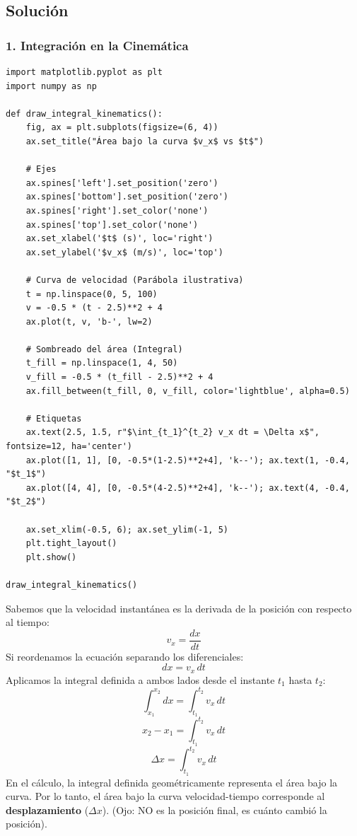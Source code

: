 \documentclass[12pt, a4paper]{article}
\begin{document}
\subsection*{Solución}

\subsubsection*{1. Integración en la Cinemática}

\begin{lstlisting}
import matplotlib.pyplot as plt
import numpy as np

def draw_integral_kinematics():
    fig, ax = plt.subplots(figsize=(6, 4))
    ax.set_title("Área bajo la curva $v_x$ vs $t$")
    
    # Ejes
    ax.spines['left'].set_position('zero')
    ax.spines['bottom'].set_position('zero')
    ax.spines['right'].set_color('none')
    ax.spines['top'].set_color('none')
    ax.set_xlabel('$t$ (s)', loc='right')
    ax.set_ylabel('$v_x$ (m/s)', loc='top')
    
    # Curva de velocidad (Parábola ilustrativa)
    t = np.linspace(0, 5, 100)
    v = -0.5 * (t - 2.5)**2 + 4
    ax.plot(t, v, 'b-', lw=2)
    
    # Sombreado del área (Integral)
    t_fill = np.linspace(1, 4, 50)
    v_fill = -0.5 * (t_fill - 2.5)**2 + 4
    ax.fill_between(t_fill, 0, v_fill, color='lightblue', alpha=0.5)
    
    # Etiquetas
    ax.text(2.5, 1.5, r"$\int_{t_1}^{t_2} v_x dt = \Delta x$", fontsize=12, ha='center')
    ax.plot([1, 1], [0, -0.5*(1-2.5)**2+4], 'k--'); ax.text(1, -0.4, "$t_1$")
    ax.plot([4, 4], [0, -0.5*(4-2.5)**2+4], 'k--'); ax.text(4, -0.4, "$t_2$")

    ax.set_xlim(-0.5, 6); ax.set_ylim(-1, 5)
    plt.tight_layout()
    plt.show()

draw_integral_kinematics()
\end{lstlisting}

Sabemos que la velocidad instantánea es la derivada de la posición con respecto al tiempo:
$$ v_x = \frac{dx}{dt} $$
Si reordenamos la ecuación separando los diferenciales:
$$ dx = v_x \, dt $$
Aplicamos la integral definida a ambos lados desde el instante $t_1$ hasta $t_2$:
$$ \int_{x_1}^{x_2} dx = \int_{t_1}^{t_2} v_x \, dt $$
$$ x_2 - x_1 = \int_{t_1}^{t_2} v_x \, dt $$
$$ \Delta x = \int_{t_1}^{t_2} v_x \, dt $$
En el cálculo, la integral definida geométricamente representa el área bajo la curva. Por lo tanto, el área bajo la curva velocidad-tiempo corresponde al \textbf{desplazamiento} ($\Delta x$). (Ojo: NO es la posición final, es cuánto cambió la posición).
\end{document}

